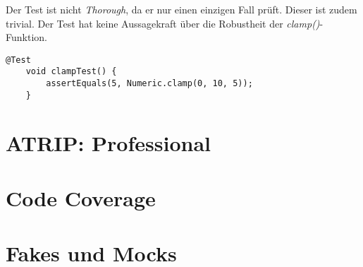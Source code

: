 Der Test ist nicht \textit{Thorough}, da er nur einen einzigen Fall
prüft. Dieser ist zudem trivial. Der Test hat keine Aussagekraft über
die Robustheit der \textit{clamp()}-Funktion.

\vspace{0.5cm}
\begin{lstlisting}[caption={ATRIP: Thorough / Negativ}]
    @Test
    void clampTest() {
        assertEquals(5, Numeric.clamp(0, 10, 5));
    }
\end{lstlisting}

\section{ATRIP: Professional}

\section{Code Coverage}

\section{Fakes und Mocks}